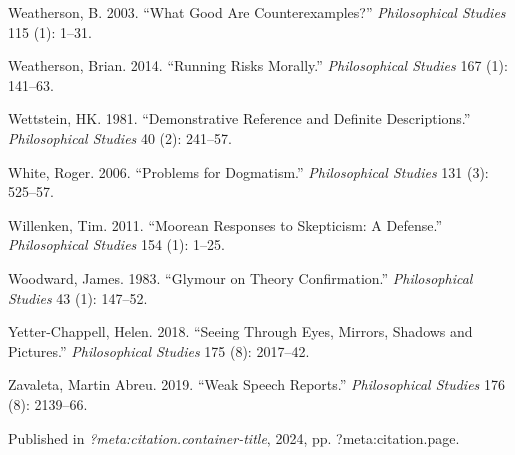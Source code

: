 \documentclass[
  10pt,
  letterpaper,
  DIV=11,
  numbers=noendperiod,
  twoside]{scrartcl}
\newlength{\cslhangindent}
\newenvironment{CSLReferences}[2] %
 {\begin{list}{}{%
  \setlength{\itemindent}{0pt}
  \setlength{\leftmargin}{0pt}
  \setlength{\parsep}{0pt}
  \ifodd #1
   \setlength{\leftmargin}{\cslhangindent}
   \setlength{\itemindent}{-1\cslhangindent}
  \fi
  \setlength{\itemsep}{#2\baselineskip}}}
 {\end{list}}
\begin{document}
\begin{CSLReferences}{1}{0}
Weatherson, B. 2003. {``What Good Are Counterexamples?''}
\emph{Philosophical Studies} 115 (1): 1--31.

Weatherson, Brian. 2014. {``Running Risks Morally.''}
\emph{Philosophical Studies} 167 (1): 141--63.

Wettstein, HK. 1981. {``Demonstrative Reference and Definite
Descriptions.''} \emph{Philosophical Studies} 40 (2): 241--57.

White, Roger. 2006. {``Problems for Dogmatism.''} \emph{Philosophical
Studies} 131 (3): 525--57.

Willenken, Tim. 2011. {``Moorean Responses to Skepticism: A Defense.''}
\emph{Philosophical Studies} 154 (1): 1--25.

Woodward, James. 1983. {``Glymour on Theory Confirmation.''}
\emph{Philosophical Studies} 43 (1): 147--52.

Yetter-Chappell, Helen. 2018. {``Seeing Through Eyes, Mirrors, Shadows
and Pictures.''} \emph{Philosophical Studies} 175 (8): 2017--42.

Zavaleta, Martin Abreu. 2019. {``Weak Speech Reports.''}
\emph{Philosophical Studies} 176 (8): 2139--66.

\end{CSLReferences}



\noindent Published in\emph{
?meta:citation.container-title}, 2024, pp. ?meta:citation.page.
\end{document}

